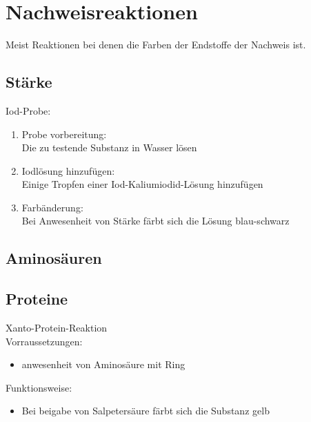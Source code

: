 \section{Nachweisreaktionen}
Meist Reaktionen bei denen die Farben der Endstoffe der Nachweis ist.

\subsection{Stärke}
\label{sec:nachweis_stärke}
Iod-Probe:
\begin{enumerate}
    \item Probe vorbereitung: \\
        Die zu testende Substanz in Wasser lösen
    \item Iodlösung hinzufügen: \\
        Einige Tropfen einer Iod-Kaliumiodid-Lösung hinzufügen
    \item Farbänderung: \\
        Bei Anwesenheit von Stärke färbt sich die Lösung blau-schwarz
\end{enumerate}

\subsection{Aminosäuren}
\label{sec:nachweis_amino}

\subsection{Proteine}
\label{sec:nachweis_proteine}
Xanto-Protein-Reaktion \\
Vorraussetzungen:
\begin{itemize}
    \item anwesenheit von Aminosäure mit Ring
\end{itemize}
Funktionsweise: 
\begin{itemize}
    \item Bei beigabe von Salpetersäure färbt sich die Substanz gelb
\end{itemize}
